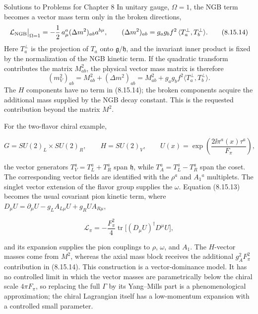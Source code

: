 \begin{bankssolutions}{Solutions to Problems for Chapter 8}
In unitary gauge, $\Omega=1$, the NGB term becomes a vector mass term only in
the broken directions,
\[
  \mathcal L_{\rm NGB}\big|_{\Omega=1}
  =-\frac12\,a_\mu^a(\Delta m^2)_{ab}a^{b\mu},
  \qquad
  (\Delta m^2)_{ab}=g_ag_b f^2\,
  \langle T_a^\perp,T_b^\perp\rangle .
  \tag{8.15.14}
\]
Here $T_a^\perp$ is the projection of $T_a$ onto
$\mathfrak g/\mathfrak h$, and the invariant inner product is fixed by the
normalization of the NGB kinetic term.  If the quadratic transform contributes
the matrix $M^2_{ab}$, the physical vector mass matrix is therefore
\[
  (m_V^2)_{ab}=M^2_{ab}+(\Delta m^2)_{ab}
  =M^2_{ab}+g_ag_b f^2
  \langle T_a^\perp,T_b^\perp\rangle .
  \tag{8.15.15}
\]
The $H$ components have no term in (8.15.14); the broken components acquire
the additional mass supplied by the NGB decay constant.  This is the requested
contribution beyond the matrix $M^2$.

For the two-flavor chiral example,

\[
  G=SU(2)_L\times SU(2)_R,\qquad H=SU(2)_V,
  \qquad U(x)=\exp\!\left(\frac{2\ii\pi^a(x)\tau^a}{F_\pi}\right),
  \tag{8.15.16}
\]

the vector generators $T_V^a=T_L^a+T_R^a$ span $\mathfrak h$, while
$T_A^a=T_L^a-T_R^a$ span the coset.  The corresponding vector fields are
identified with the $\rho^a$ and $A_1{}^a$ multiplets.  The singlet vector
extension of the flavor group supplies the $\omega$.  Equation (8.15.13)
becomes the usual covariant pion kinetic term, where
$D_\mu U=\partial_\mu U-g_LA_{L\mu}U+g_RU A_{R\mu}$,

\[
  \mathcal L_\pi=-\frac{F_\pi^2}{4}
  \operatorname{tr}\bigl[(D_\mu U)^\dagger D^\mu U\bigr],
  \tag{8.15.17}
\]

and its expansion supplies the pion couplings to $\rho$, $\omega$, and $A_1$.
The $H$-vector masses come from $M^2$, whereas the axial mass block receives
the additional $g_A^2F_\pi^2$ contribution in (8.15.14).  This construction is
a vector-dominance model.  It has no controlled limit in which the vector
masses are parametrically below the chiral scale $4\pi F_\pi$, so replacing
the full $\Gamma$ by its Yang--Mills part is a phenomenological approximation;
the chiral Lagrangian itself has a low-momentum expansion with a controlled
small parameter.

\end{bankssolutions}
